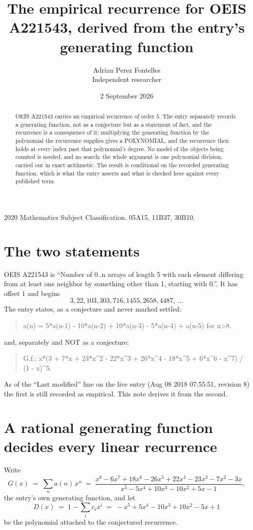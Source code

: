 \documentclass[11pt,a4paper]{article}
\title{The empirical recurrence for OEIS A221543, derived from the entry's generating function}
\author{Adrian Perez Fontelles\\ \small Independent researcher}
\date{2 September 2026}
\theoremstyle{plain}
\theoremstyle{definition}
\begin{document}
\maketitle

\begin{abstract}
OEIS A221543 carries an empirical recurrence of order $5$. The entry separately records a
generating function, not as a conjecture but as a statement of fact, and the recurrence is a
consequence of it: multiplying the generating function by the polynomial the recurrence
supplies gives a POLYNOMIAL, and the recurrence then holds at every index past that
polynomial's degree. No model of the objects being counted is needed, and no search: the
whole argument is one polynomial division, carried out in exact arithmetic. The result is
conditional on the recorded generating function, which is what the entry asserts and what is
checked here against every published term.
\end{abstract}

\noindent\small 2020 Mathematics Subject Classification. 05A15, 11B37, 30B10.\normalsize

\section{The two statements}

OEIS A221543 is ``Number of 0..n arrays of length 5 with each element differing from at least one neighbor by something other than 1, starting with 0.''. It has offset $1$ and begins
\[
3, 22, 103, 303, 716, 1455, 2658, 4487,\ \dots
\]
The entry states, as a conjecture and never marked settled:
\begin{quote}
a(n) = 5*a(n-1) - 10*a(n-2) + 10*a(n-3) - 5*a(n-4) + a(n-5) for n>8.
\end{quote}
and, separately and NOT as a conjecture:
\begin{quote}
G.f.: x*(3 + 7*x + 23*x\^{}2 - 22*x\^{}3 + 26*x\^{}4 - 18*x\^{}5 + 6*x\^{}6 - x\^{}7) / (1 - x)\^{}5.
\end{quote}
As of the ``Last modified'' line on the live entry (Aug 08 2018 07:55:51, revision 8) the first is still
recorded as empirical. This note derives it from the second.

\section{A rational generating function decides every linear recurrence}

Write
\[
G(x)\;=\;\sum_{n}a(n)\,x^{n}\;=\;\frac{x^{8} - 6 x^{7} + 18 x^{6} - 26 x^{5} + 22 x^{4} - 23 x^{3} - 7 x^{2} - 3 x}{x^{5} - 5 x^{4} + 10 x^{3} - 10 x^{2} + 5 x - 1},
\]
the entry's own generating function, and let
\[
D(x)\;=\;1-\sum_i c_i x^{i}\;=\;- x^{5} + 5 x^{4} - 10 x^{3} + 10 x^{2} - 5 x + 1
\]
be the polynomial attached to the conjectured recurrence.
\end{document}
